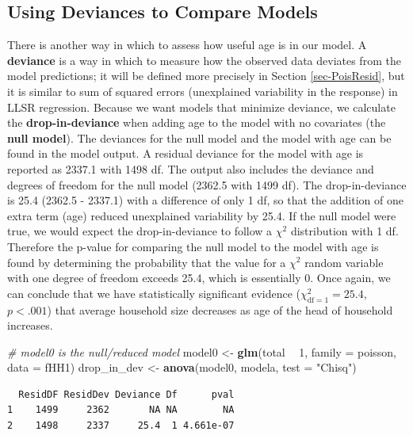 \documentclass[
]{krantz}
\newenvironment{Shaded}{\begin{snugshade}}{\end{snugshade}}
\newcommand{\CommentTok}[1]{\textcolor[rgb]{0.37,0.37,0.37}{\textit{#1}}}
\newcommand{\DataTypeTok}[1]{\textcolor[rgb]{0.27,0.27,0.27}{#1}}
\newcommand{\DecValTok}[1]{\textcolor[rgb]{0.06,0.06,0.06}{#1}}
\newcommand{\KeywordTok}[1]{\textcolor[rgb]{0.27,0.27,0.27}{\textbf{#1}}}
\newcommand{\NormalTok}[1]{#1}
\newcommand{\OperatorTok}[1]{\textcolor[rgb]{0.43,0.43,0.43}{\textbf{#1}}}
\newcommand{\StringTok}[1]{\textcolor[rgb]{0.5,0.5,0.5}{#1}}
\begin{document}
\hypertarget{sec-Devtocompare}{%
\subsection{Using Deviances to Compare Models}\label{sec-Devtocompare}}

There is another way in which to assess how useful age is in our model. A \textbf{deviance}  is a way in which to measure how the observed data deviates from the model predictions; it will be defined more precisely in Section \ref{sec-PoisResid}, but it is similar to sum of squared errors (unexplained variability in the response) in LLSR regression. Because we want models that minimize deviance, we calculate the \textbf{drop-in-deviance}  when adding age to the model with no covariates (the \textbf{null model}).  The deviances for the null model and the model with age can be found in the model output. A residual deviance for the model with age is reported as 2337.1 with 1498 df. The output also includes the deviance and degrees of freedom for the null model (2362.5 with 1499 df). The drop-in-deviance is 25.4 (2362.5 - 2337.1) with a difference of only 1 df, so that the addition of one extra term (age) reduced unexplained variability by 25.4. If the null model were true, we would expect the drop-in-deviance to follow a \(\chi^2\) distribution with 1 df. Therefore the p-value for comparing the null model to the model with age is found by determining the probability that the value for a \(\chi^2\) random variable with one degree of freedom exceeds 25.4, which is essentially 0. Once again, we can conclude that we have statistically significant evidence (\(\chi^2_{\text{df} =1}=25.4\), \(p < .001\)) that average household size decreases as age of the head of household increases.

\begin{Shaded}
\begin{Highlighting}[]
\CommentTok{# model0 is the null/reduced model}
\NormalTok{model0 <-}\StringTok{ }\KeywordTok{glm}\NormalTok{(total }\OperatorTok{~}\StringTok{ }\DecValTok{1}\NormalTok{, }\DataTypeTok{family =}\NormalTok{ poisson, }\DataTypeTok{data =}\NormalTok{ fHH1)}
\NormalTok{drop_in_dev <-}\StringTok{ }\KeywordTok{anova}\NormalTok{(model0, modela, }\DataTypeTok{test =} \StringTok{"Chisq"}\NormalTok{)}
\end{Highlighting}
\end{Shaded}

\begin{verbatim}
  ResidDF ResidDev Deviance Df      pval
1    1499     2362       NA NA        NA
2    1498     2337     25.4  1 4.661e-07
\end{verbatim}
\end{document}

